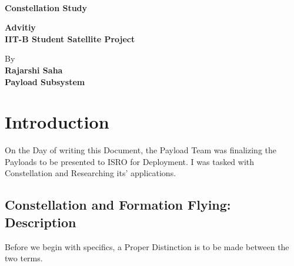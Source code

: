 \documentclass[12pt, a4paper, oneside]{book}
\begin{document}
%
%
\thispagestyle{empty}

{%
\sffamily
\centering
\Large

~\vspace{\fill}

{\huge 
\bfseries{Constellation Study}
}

\vspace{2cm}

{\LARGE
\bfseries{Advitiy\\ \bigskip IIT-B Student Satellite Project}
}

\vspace{2cm}

By \\ \bigskip \bfseries{Rajarshi Saha\\ \bigskip Payload Subsystem}

\vspace{1.5cm}

\vspace{2.5cm}


}%


\tableofcontents
\clearpage

\chapter{Introduction}

On the Day of writing this Document, the Payload Team was finalizing the Payloads to be presented to ISRO for Deployment. I was tasked with Constellation and Researching its' applications.

\section{Constellation and Formation Flying: Description}

Before we begin with specifics, a Proper Distinction is to be made between the two terms.
\end{document}
